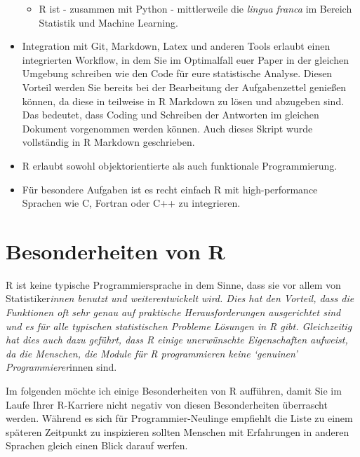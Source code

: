 \documentclass[]{tufte-book}
\providecommand{\tightlist}{%
  \setlength{\itemsep}{0pt}\setlength{\parskip}{0pt}}
\begin{document}
\begin{itemize}
  \begin{itemize}
  \tightlist
  \item
    R ist - zusammen mit Python - mittlerweile die \emph{lingua franca}
    im Bereich Statistik und Machine Learning.
  \end{itemize}
\item
  Integration mit Git, Markdown, Latex und anderen Tools erlaubt einen
  integrierten Workflow, in dem Sie im Optimalfall euer Paper in der
  gleichen Umgebung schreiben wie den Code für eure statistische
  Analyse. Diesen Vorteil werden Sie bereits bei der Bearbeitung der
  Aufgabenzettel genießen können, da diese in teilweise in R Markdown zu
  lösen und abzugeben sind. Das bedeutet, dass Coding und Schreiben der
  Antworten im gleichen Dokument vorgenommen werden können. Auch dieses
  Skript wurde vollständig in R Markdown geschrieben.
\item
  R erlaubt sowohl objektorientierte als auch funktionale
  Programmierung.
\item
  Für besondere Aufgaben ist es recht einfach R mit high-performance
  Sprachen wie C, Fortran oder C++ zu integrieren.
\end{itemize}

\section{Besonderheiten von R}\label{besonderheiten-von-r}

R ist keine typische Programmiersprache in dem Sinne, dass sie vor allem
von Statistiker\emph{innen benutzt und weiterentwickelt wird. Dies hat
den Vorteil, dass die Funktionen oft sehr genau auf praktische
Herausforderungen ausgerichtet sind und es für alle typischen
statistischen Probleme Lösungen in R gibt. Gleichzeitig hat dies auch
dazu geführt, dass R einige unerwünschte Eigenschaften aufweist, da die
Menschen, die Module für R programmieren keine `genuinen'
Programmierer}innen sind.

Im folgenden möchte ich einige Besonderheiten von R aufführen, damit Sie
im Laufe Ihrer R-Karriere nicht negativ von diesen Besonderheiten
überrascht werden. Während es sich für Programmier-Neulinge empfiehlt
die Liste zu einem späteren Zeitpunkt zu inspizieren sollten Menschen
mit Erfahrungen in anderen Sprachen gleich einen Blick darauf werfen.
\end{document}

